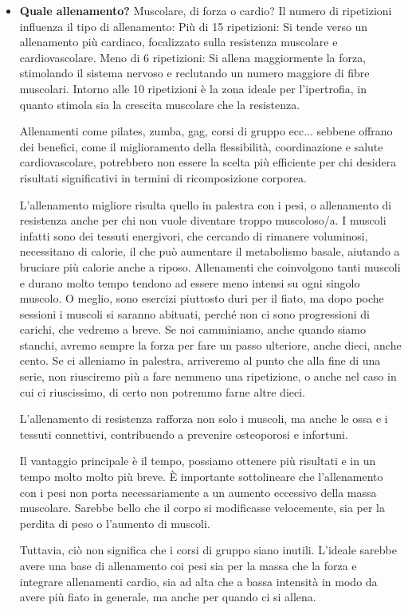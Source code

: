 \documentclass[12pt]{book} %
\begin{document}
\begin{itemize}
\item \textbf{Quale allenamento?}
Muscolare, di forza o cardio?
Il numero di ripetizioni influenza il tipo di allenamento:
Più di 15 ripetizioni: Si tende verso un allenamento più cardiaco, focalizzato sulla resistenza muscolare e cardiovascolare.
Meno di 6 ripetizioni: Si allena maggiormente la forza, stimolando il sistema nervoso e reclutando un numero maggiore di fibre muscolari.
Intorno alle 10 ripetizioni è la zona ideale per l'ipertrofia, in quanto stimola sia la crescita muscolare che la resistenza.

Allenamenti come pilates, zumba, gag,  corsi di gruppo ecc... sebbene offrano dei benefici, come il miglioramento della flessibilità, coordinazione e salute cardiovascolare, potrebbero non essere la scelta più efficiente per chi desidera risultati significativi in termini di ricomposizione corporea.

L'allenamento migliore risulta quello in palestra con i pesi, o allenamento di resistenza anche per chi non vuole diventare troppo muscoloso/a.
I muscoli infatti sono dei tessuti energivori, che cercando di rimanere voluminosi, necessitano di calorie, il che può aumentare il metabolismo basale, aiutando a bruciare più calorie anche a riposo.
Allenamenti che coinvolgono tanti muscoli e durano molto tempo tendono ad essere meno intensi su ogni singolo muscolo. O meglio, sono esercizi piuttosto duri per il fiato, ma dopo poche sessioni i muscoli si saranno abituati, perché non ci sono progressioni di carichi, che vedremo a breve. Se noi camminiamo, anche quando siamo stanchi, avremo sempre la forza per fare un passo ulteriore, anche dieci, anche cento. Se ci alleniamo in palestra, arriveremo al punto che alla fine di una serie, non riusciremo più a fare nemmeno una ripetizione, o anche nel caso in cui ci riuscissimo, di certo non potremmo farne altre dieci.

L'allenamento di resistenza rafforza non solo i muscoli, ma anche le ossa e i tessuti connettivi, contribuendo a prevenire osteoporosi e infortuni. 

Il vantaggio principale è il tempo, possiamo ottenere più risultati e in un tempo molto molto più breve. È importante sottolineare che l'allenamento con i pesi non porta necessariamente a un aumento eccessivo della massa muscolare. Sarebbe bello che il corpo si modificasse velocemente, sia per la perdita di peso o l'aumento di muscoli.

Tuttavia, ciò non significa che i corsi di gruppo siano inutili. L'ideale sarebbe avere una base di allenamento coi pesi sia per la massa che la forza e integrare allenamenti cardio, sia ad alta che a bassa intensità in modo da avere più fiato in generale, ma anche per quando ci si allena.


\end{itemize}
\end{document}
